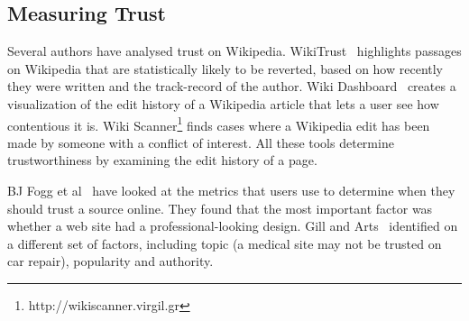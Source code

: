 \documentclass{www2010-submission}
\newcommand{\todo}[1]{}
\begin{document}
\todo{Cite plagarism detection}
\todo{Talk about how our algorithm looks for key terms used in disputed claims}
\todo{Talk about how our first pass NLP algo is rather like }

%
%
%
%
%
%
%
%
%
%


\subsection{Measuring Trust}

Several authors have analysed trust on Wikipedia. WikiTrust~\cite{Adler2008a} highlights passages on Wikipedia that are statistically likely to be reverted, based on how recently they were written and the track-record of the author. Wiki Dashboard~\cite{Kittur2008} creates a visualization of the edit history of a Wikipedia article that lets a user see how contentious it is. Wiki Scanner\footnote{http://wikiscanner.virgil.gr} finds cases where a Wikipedia edit has been made by someone with a conflict of interest. All these tools determine trustworthiness by examining the edit history of a page.

BJ Fogg et al~\cite{Fogg2000, Fogg2003} have looked at the metrics that users use to determine when they should trust a source online. They found that the most important factor was whether a web site had a professional-looking design. Gill and Arts~\cite{Gil2006} identified on a different set of factors, including topic (a medical site may not be trusted on car repair), popularity and authority.
\end{document}
